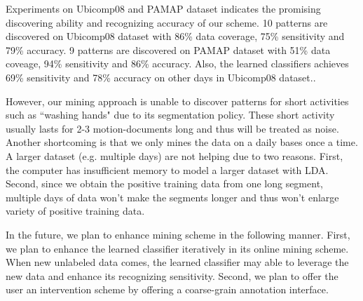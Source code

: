 \documentclass{sigchi}
\begin{document}
    Experiments on Ubicomp08 and PAMAP dataset indicates the promising discovering ability and recognizing accuracy of our scheme.
    10 patterns are discovered on Ubicomp08 dataset with 86\% data coverage, 75\% sensitivity and 79\% accuracy.
    9 patterns are discovered on PAMAP dataset with 51\% data coveage, 94\% sensitivity and 86\% accuracy.
    Also, the learned classifiers achieves 69\% sensitivity and 78\% accuracy on other days in Ubicomp08 dataset..


     However, our mining approach is unable to discover patterns for short activities such as ``washing hands" due to its segmentation policy.
     These short activity usually lasts for 2-3 motion-documents long and thus will be treated as noise.
     Another shortcoming is that we only mines the data on a daily bases once a time.
     A larger dataset (e.g. multiple days) are not helping due to two reasons.
     First, the computer has insufficient memory to model a larger dataset with LDA.
     Second, since we obtain the positive training data from one long segment, multiple days of data won't make the segments longer and thus won't enlarge variety of positive training data.

    In the future, we plan to enhance mining scheme in the following manner.
    First, we plan to enhance the learned classifier iteratively in its online mining scheme.
    When new unlabeled data comes, the learned classifier may able to leverage the new data and enhance its recognizing sensitivity.
    Second, we plan to offer the user an intervention scheme by offering a coarse-grain annotation interface.



%
%
%
%
%
\balance



\end{document}
